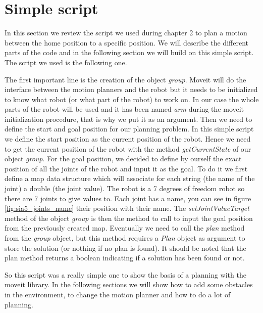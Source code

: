 \section{Simple script}

In this section we review the script we used during chapter 2 to plan a motion between the home position to a specific position. We will describe the different parts of the code and in the following section we will build on this simple script. The script we used is the following one.



The first important line is the creation of the object \emph{group}. Moveit will do the interface between the motion planners and the robot but it needs to be initialized to know what robot (or what part of the robot) to work on. In our case the whole parts of the robot will be used and it has been named \emph{arm} during the moveit initialization procedure, that is why we put it as an argument. Then we need to define the start and goal position for our planning problem. In this simple script we define the start position as the current position of the robot. Hence we need to get the current position of the robot with the method \emph{getCurrentState} of our object \emph{group}. For the goal position, we decided to define by ourself the exact position of all the joints of the robot and input it as the goal. To do it we first define a map data structure which will associate for each string (the name of the joint) a double (the joint value). The robot is a 7 degrees of freedom robot so there are 7 joints to give values to. Each joint has a name, you can see in figure \ref{fig:sia5_joints_name} their position with their name. The \emph{setJointValueTarget} method of the object \emph{group} is then the method to call to input the goal position from the previously created map. Eventually we need to call the \emph{plan} method from the \emph{group} object, but this method requires a \emph{Plan} object as argument to store the solution (or nothing if no plan is found). It should be noted that the plan method returns a boolean indicating if a solution has been found or not.

So this script was a really simple one to show the basis of a planning with the moveit library. In the following sections we will show how to add some obstacles in the environment, to change the motion planner and how to do a lot of planning.